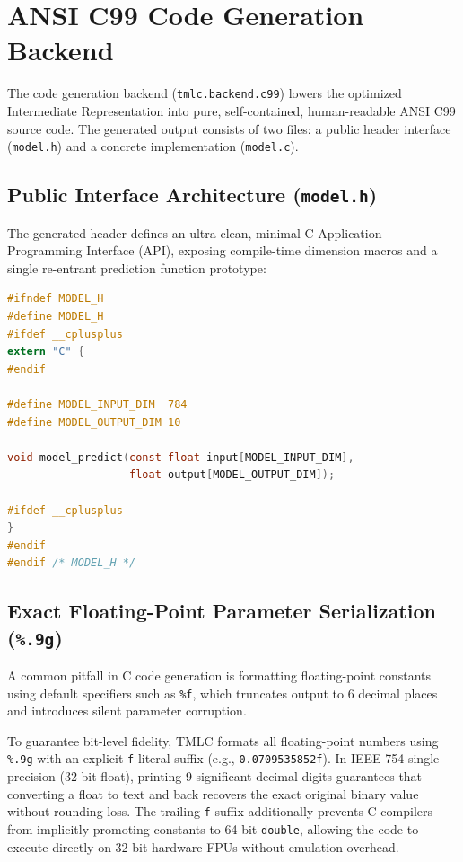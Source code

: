 \documentclass[11pt,a4paper]{article}
\begin{document}
\section{ANSI C99 Code Generation Backend}
\label{sec:codegen}

The code generation backend (\texttt{tmlc.backend.c99}) lowers the optimized Intermediate Representation into pure, self-contained, human-readable ANSI C99 source code. The generated output consists of two files: a public header interface (\texttt{model.h}) and a concrete implementation (\texttt{model.c}).

\subsection{Public Interface Architecture (\texttt{model.h})}
The generated header defines an ultra-clean, minimal C Application Programming Interface (API), exposing compile-time dimension macros and a single re-entrant prediction function prototype:
\begin{lstlisting}[language=C, basicstyle=\ttfamily\footnotesize, frame=single]
#ifndef MODEL_H
#define MODEL_H
#ifdef __cplusplus
extern "C" {
#endif

#define MODEL_INPUT_DIM  784
#define MODEL_OUTPUT_DIM 10

void model_predict(const float input[MODEL_INPUT_DIM], 
                   float output[MODEL_OUTPUT_DIM]);

#ifdef __cplusplus
}
#endif
#endif /* MODEL_H */
\end{lstlisting}

\subsection{Exact Floating-Point Parameter Serialization (\texttt{\%.9g})}
A common pitfall in C code generation is formatting floating-point constants using default specifiers such as \texttt{\%f}, which truncates output to 6 decimal places and introduces silent parameter corruption.

To guarantee bit-level fidelity, TMLC formats all floating-point numbers using \texttt{\%.9g} with an explicit \texttt{f} literal suffix (e.g., \texttt{0.0709535852f}). In IEEE 754 single-precision (32-bit float), printing 9 significant decimal digits guarantees that converting a float to text and back recovers the exact original binary value without rounding loss. The trailing \texttt{f} suffix additionally prevents C compilers from implicitly promoting constants to 64-bit \texttt{double}, allowing the code to execute directly on 32-bit hardware FPUs without emulation overhead.
\end{document}
